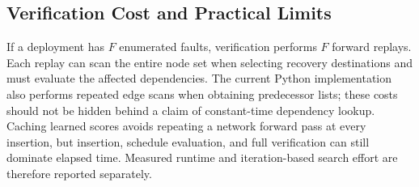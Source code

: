 \subsection{Verification Cost and Practical Limits}
If a deployment has $F$ enumerated faults, verification performs $F$ forward
replays. Each replay can scan the entire node set when selecting recovery
destinations and must evaluate the affected dependencies. The current Python
implementation also performs repeated edge scans when obtaining predecessor
lists; these costs should not be hidden behind a claim of constant-time
dependency lookup. Caching learned scores
avoids repeating a network forward pass at every insertion, but insertion,
schedule evaluation, and full verification can still dominate elapsed time.
Measured runtime and iteration-based search effort are therefore reported
separately.
